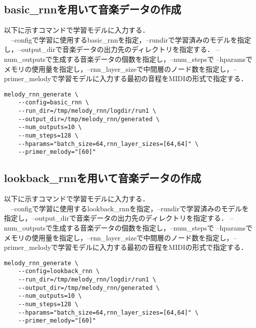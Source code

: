 \subsection{basic\_rnnを用いて音楽データの作成}
以下に示すコマンドで学習モデルに入力する．\\
　--configで学習に使用するbasic\_rnnを指定，--rundirで学習済みのモデルを指定し，--output\_dirで音楽データの出力先のディレクトリを指定する．
--num\_outputsで生成する音楽データの個数を指定し，--num\_stepsで
--hparamsでメモリの使用量を指定し，--rnn\_layer\_sizeで中間層のノード数を指定し，--primer\_melodyで学習モデルに入力する最初の音程をMIDIの形式で指定する．\\
\begin{lstlisting}[basicstyle=\ttfamily\footnotesize,frame=single]
    melody_rnn_generate \
    --config=basic_rnn \
    --run_dir=/tmp/melody_rnn/logdir/run1 \
    --output_dir=/tmp/melody_rnn/generated \
    --num_outputs=10 \
    --num_steps=128 \
    --hparams="batch_size=64,rnn_layer_sizes=[64,64]" \
    --primer_melody="[60]"
\end{lstlisting}
\subsection{lookback\_rnnを用いて音楽データの作成}
以下に示すコマンドで学習モデルに入力する．\\
　--configで学習に使用するlookback\_rnnを指定，--rundirで学習済みのモデルを指定し，--output\_dirで音楽データの出力先のディレクトリを指定する．
--num\_outputsで生成する音楽データの個数を指定し，--num\_stepsで
--hparamsでメモリの使用量を指定し，--rnn\_layer\_sizeで中間層のノード数を指定し，--primer\_melodyで学習モデルに入力する最初の音程をMIDIの形式で指定する．\\
\begin{lstlisting}[basicstyle=\ttfamily\footnotesize,frame=single]
    melody_rnn_generate \
    --config=lookback_rnn \
    --run_dir=/tmp/melody_rnn/logdir/run1 \
    --output_dir=/tmp/melody_rnn/generated \
    --num_outputs=10 \
    --num_steps=128 \
    --hparams="batch_size=64,rnn_layer_sizes=[64,64]" \
    --primer_melody="[60]"
\end{lstlisting}
\newpage
